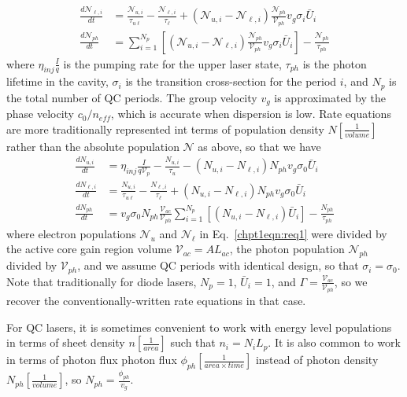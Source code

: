 \documentclass[12pt]{report}
\begin{document}
{\begin{subequations}
\begin{align}
%
\frac{d \mathcal{N}_{\ell,i}}{dt} &= \frac{\mathcal{N}_{u,i}}{\tau_{u\ell}} - \frac{\mathcal{N}_{\ell,i}}{\tau_\ell} + \left( \mathcal{N}_{u,i} - \mathcal{N}_{\ell,i}\right) \frac{\mathcal{N}_{ph}}{\mathcal{V}_{ph}} v_g \sigma_i \bar{U}_i\\
%
\frac{d \mathcal{N}_{ph}}{dt} &= \sum_{i=1}^{N_p}\left[ \left( \mathcal{N}_{u,i} - \mathcal{N}_{\ell,i}\right) \frac{\mathcal{N}_{ph}}{\mathcal{V}_{ph}} v_g \sigma_i \bar{U}_i \right] - \frac{\mathcal{N}_{ph}}{\tau_{ph}}
\end{align}
\end{subequations}
where $\eta_{inj}\frac{I}{q}$ is the pumping rate for the upper laser state, $\tau_{ph}$ is the photon lifetime in the cavity, $\sigma_i$ is the transition cross-section for the period $i$, and $N_p$ is the total number of QC periods.  The group velocity $v_g$ is approximated by the phase velocity $c_0/n_{eff}$, which is accurate when dispersion is low.  Rate equations are more traditionally represented int terms of population density $N \left[\frac{1}{{volume}}\right]$ rather than the absolute population $\mathcal{N}$ as above, so that we have
\begin{subequations}
\begin{align}
\frac{d N_{u,i}}{dt}&=\eta_{inj} \frac{I}{q \mathcal{V}_{p}} - \frac{N_{u,i}}{\tau_u} - \left( N_{u,i} - N_{\ell,i}\right) N_{ph} v_g \sigma_0 \bar{U}_i\\
%
\frac{d N_{\ell,i}}{dt}&=\frac{N_{u,i}}{\tau_{u\ell}}-\frac{N_{\ell,i}}{\tau_\ell} + \left( N_{u,i} - N_{\ell,i}\right) N_{ph} v_g \sigma_0 \bar{U}_i\\
%
\frac{d N_{ph}}{dt}&=v_g \sigma_0 N_{ph} \frac{\mathcal{V}_{ac}}{\mathcal{V}_{ph}} \sum_{i=1}^{N_p}\left[ \left(N_{u,i} - N_{\ell,i}\right) \bar{U}_i \right] - \frac{N_{ph}}{\tau_{ph}}
\label{chpt1eqn:req2c}
\end{align}
\end{subequations}
where electron populations $\mathcal{N}_u$ and $\mathcal{N}_\ell$ in Eq.~\eqref{chpt1eqn:req1} were divided by the active core gain region volume $\mathcal{V}_{ac}=A L_{ac}$, the photon population $\mathcal{N}_{ph}$ divided by $\mathcal{V}_{ph}$, and we assume QC periods with identical design, so that $\sigma_i=\sigma_0$.  Note that traditionally for diode lasers, $N_p=1$, $\bar{U}_i=1$, and $\Gamma=\frac{\mathcal{V}_{ac}}{\mathcal{V}_{ph}}$, so we recover the conventionally-written rate equations \cite{Chuang} \cite{ColdrenCorzine} in that case.

For QC lasers, it is sometimes convenient to work with energy level populations in terms of sheet density $n \left[\frac{1}{{area}}\right]$ such that $n_i=N_i L_p$.  It is also common to work in terms of photon flux photon flux $\phi_{ph} \left[\frac{1}{{area}\times{time}}\right]$ instead of photon density $N_{ph} \left[\frac{1}{{volume}}\right]$, so $N_{ph}=\frac{\phi_{ph}}{v_g}$.

}
\end{document}
